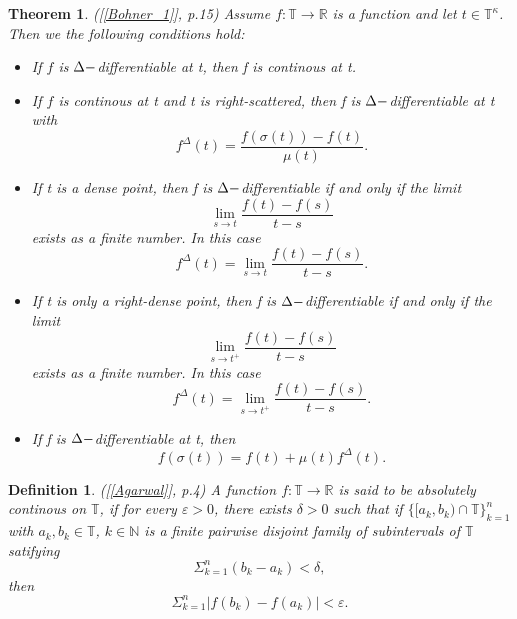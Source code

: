 \documentclass[12pt,a4paper,oneside,titlepage]{article}
\newtheorem{Twierdzenie}{Theorem}
\newtheorem{Def}{Definition}
\renewcommand{\epsilon}{\varepsilon}
\begin{document}
\begin{Twierdzenie}([\ref{Bohner_1}], p.15)
Assume $f: \mathbb{T} \rightarrow \mathbb{R}$ is a function and let $t \in \mathbb{T}^{\kappa}$. Then we the following conditions hold:
\begin{itemize}
\item[(a)] If $f$ is $\Delta \-- $differentiable at t, then f is continous at t.
\item[(b)] If $f$ is continous at t and t is right-scattered, then f is $\Delta \-- $differentiable at t with
\begin{equation}
\nonumber
f^{\Delta}(t)=\frac{f(\sigma (t))-f(t)}{\mu (t)}.
\end{equation}
\item[(c)] If t is a dense point, then f is $\Delta \-- $differentiable if and only if the limit 
\begin{equation}
\nonumber
\lim_{s \rightarrow t } \frac{f(t)-f(s)}{t-s}
\end{equation}
exists as a finite number. In this case
\begin{equation}
f^{\Delta}(t)= \lim_{s \rightarrow t } \frac{f(t)-f(s)}{t-s}.
\end{equation}
\item[(d)] If t is only a right-dense point, then f is $\Delta \-- $differentiable if and only if the limit 
\begin{equation}
\nonumber
\lim_{s \rightarrow t^+ } \frac{f(t)-f(s)}{t-s}
\end{equation}
exists as a finite number. In this case
\begin{equation}
f^{\Delta}(t)= \lim_{s \rightarrow t^+ } \frac{f(t)-f(s)}{t-s}.
\end{equation}
\item[(e)] If f is $\Delta \-- $differentiable at t, then
\begin{equation}
\nonumber
f(\sigma(t))=f(t)+\mu (t) f^{\Delta}(t).
\end{equation}
\end{itemize}

\end{Twierdzenie}
\begin{Def}([\ref{Agarwal}], p.4) A function $f:\mathbb{T} \rightarrow \mathbb{R}$ is said to be absolutely continous on $\mathbb{T}$, if for every $\epsilon>0$, there exists $\delta>0$ such that 
if $\lbrace [a_k, b_k) \cap \mathbb{T} \rbrace_{k=1}^{n} $ with $a_k,b_k \in \mathbb{T}$, $k \in \mathbb{N}$ is a finite pairwise disjoint family of subintervals of $\mathbb{T}$ satifying 
\begin{equation}
\nonumber
\Sigma_{k=1}^n (b_k-a_k)< \delta,
\end{equation}
then
\begin{equation}
\nonumber
\Sigma_{k=1}^n  \vert f(b_k) - f(a_k) \vert < \epsilon.
\end{equation}
\end{Def}
\end{document}
